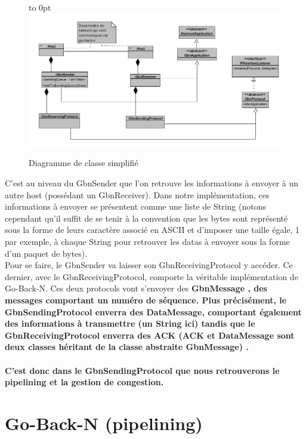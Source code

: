 \documentclass[11pt]{article}
\begin{document}
\begin{figure}[h]
  \hfill\hbox to 0pt{\hss\includegraphics[scale=0.86]{bwuml.png}\hss}\hfill\null
  \caption{Diagramme de classe simplifié}
\end{figure}

C'est au niveau du GbnSender que l'on retrouve les informations à envoyer à un autre host (possédant un GbnReceiver). Dans notre implémentation, ces informations à envoyer se présentent comme une liste de String (notons cependant qu'il suffit de se tenir à la convention que les bytes sont représenté sous la forme de leurs caractère associé en ASCII et d'imposer une taille égale, 1 par exemple, à chaque String pour retrouver les datas à envoyer sous la forme d'un paquet de bytes). \\
Pour se faire, le GbnSender va laisser son GbnReceivingProtocol y accéder. Ce dernier, avec le GbnReceivingProtocol, comporte la véritable implémentation de Go-Back-N. Ces deux protocols vont s'envoyer des \bfseries GbnMessage \mdseries , des messages comportant un numéro de séquence. Plus précisément, le GbnSendingProtocol enverra des \bfseries DataMessage\mdseries , comportant également des informations à transmettre (un String ici) tandis que le GbnReceivingProtocol enverra des \bfseries ACK \mdseries (ACK et DataMessage sont deux classes héritant de la classe abstraite GbnMessage) .\\ 
\\
C'est donc dans le GbnSendingProtocol que nous retrouverons le pipelining et la gestion de congestion.


\section{Go-Back-N (pipelining)}
\end{document}
